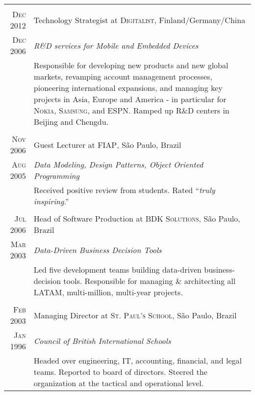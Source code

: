\documentclass[a4paper,10pt]{article}
\begin{document}
\begin{tabular}{r|p{11cm}}
  \multicolumn{2}{c}{}\\

  \textsc{Dec 2012} & Technology Strategist at \textsc{Digitalist},
  Finland/Germany/China \\

  \textsc{Dec 2006} & \emph{R\&D services for Mobile and Embedded Devices} \\

  &\footnotesize{Responsible for developing new products and new global markets,
    revamping account management processes, pioneering international expansions,
    and managing key projects in Asia, Europe and America - in particular for
    \textsc{Nokia}, \textsc{Samsung}, and \textsc{ESPN}. Ramped up R\&D centers
    in Beijing and Chengdu.}\\

  \multicolumn{2}{c}{}\\

  \textsc{Nov 2006} & Guest Lecturer at \textsc{FIAP}, S\~{a}o Paulo, Brazil \\

  \textsc{Aug 2005} & \emph{Data Modeling, Design Patterns, Object Oriented
    Programming} \\

  &\footnotesize{Received positive review from students. Rated ``\emph{truly
      inspiring}.''}\\

  \multicolumn{2}{c}{}\\

  \textsc{Jul 2006} & Head of Software Production at \textsc{BDK Solutions},
  S\~{a}o Paulo, Brazil \\

  \textsc{Mar 2003} & \emph{Data-Driven Business Decision Tools} \\

  &\footnotesize{Led five development teams building data-driven
    business-decision tools. Responsible for managing \& architecting
    all LATAM, multi-million, multi-year projects.}\\

  \multicolumn{2}{c}{}\\

  \textsc{Feb 2003} & Managing Director at \textsc{St. Paul's School}, S\~{a}o
  Paulo, Brazil \\

  \textsc{Jan 1996} & \emph{Council of British International Schools} \\

  &\footnotesize{Headed over engineering, IT, accounting, financial, and legal
    teams. Reported to board of directors. Steered the organization at the
    tactical and operational level.}\\

\end{tabular}
\end{document}
